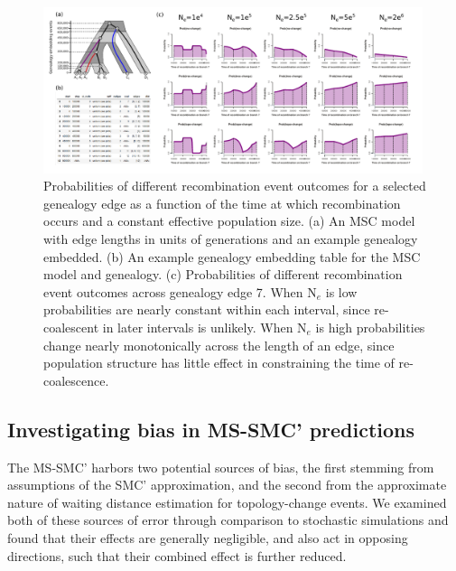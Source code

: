 \documentclass[11pt]{article}
\begin{document}

\begin{figure}[p]
	\centering
	\includegraphics[width=0.99\textwidth]{figures/Fig-S2-edge-probabilities.pdf}	
	\caption{
		Probabilities of different recombination event outcomes for a selected 
		genealogy edge as a function of the time at which recombination occurs 
		and a constant effective population size.
		(a) An MSC model with edge lengths in units of generations and an example
		genealogy embedded. (b) An example genealogy embedding table for the MSC
		model and genealogy. (c) Probabilities of different recombination event
		outcomes across genealogy edge 7. When N$_e$ is low probabilities are 
		nearly constant within each interval, since re-coalescent in later intervals
		is unlikely. When N$_e$ is high probabilities change nearly monotonically 
		across the length of an edge, since population structure has little effect
		in constraining the time of re-coalescence.
	}
     \label{fig:figS-edge-probabilities}
\end{figure}

\newpage




\subsection{Investigating bias in MS-SMC' predictions}
The MS-SMC' harbors two potential sources of bias, the first stemming from 
assumptions of the SMC' approximation, and the second from the approximate 
nature of waiting distance estimation for topology-change events. We examined 
both of these sources of error through comparison to stochastic simulations 
and found that their effects are generally negligible, and also act in opposing 
directions, such that their combined effect is further reduced.
\end{document}
